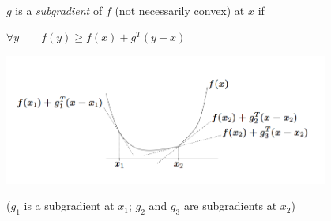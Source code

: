\\
$g$ is a \emph{subgradient} of $f$ (not necessarily convex) at $x$ if 
\\
\begin{center}
$\forall y  \qquad f(y) \geq f(x)+ g^T(y-x)  $
\end{center}


\begin{center}
\includegraphics[width=0.8\textwidth]{subgrad_figure}
\end{center}


($g_1$ is a subgradient at $x_1$; $g_2$ and $g_3$ are subgradients at
$x_2$)%


